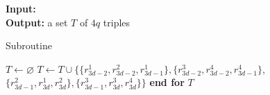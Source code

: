 \begin{algorithm}
\textbf{Input:}\\
\textbf{Output:} a set $T$ of $4q$ triples
\smallskip
\begin{algorithmic}
\caption{Subroutine~ \label{alg:3defr_wje_subroutine_multipleOfThreeC4s}}
\State $T\gets \varnothing$
     \State $T \gets T \cup \{ \{ r_{3d-2}^1, r_{3d-2}^2, r_{3d-1}^1 \}, \{ r_{3d-2}^3, r_{3d-2}^4, r_{3d-1}^4 \}$,\\
      $\{ r_{3d-1}^2, r_{3d}^1, r_{3d}^2 \}, \{ r_{3d-1}^3, r_{3d}^3, r_{3d}^4 \} \}$
    \EndFor
\State \textbf{end for}
\smallskip
\State \Return $T$
\end{algorithmic}
\end{algorithm}

 



